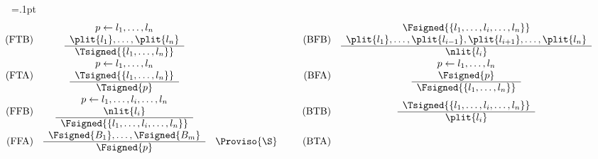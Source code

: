 \arrayrulewidth=.1pt
{\scriptsize %
\[\hspace{-0.75cm}
\begin{array}{@{}rclp{5pt}rcl}
  \text{(FTB)}
  &
  \begin{array}{c}
    p \leftarrow l_1, \dots, l_n
    \\
    \plit{l_1},\dots,\plit{l_n}
    \\\hline
    \Tsigned{\{l_1, \dots, l_n\}}
  \end{array}
  &
  &&
  \text{(BFB)}
  &
  \begin{array}{c}
    \Fsigned{\{l_1, \dots, l_i, \dots, l_n\}}
    \\
    \plit{l_1},\dots,\plit{l_{i-1}}
    ,
    \plit{l_{i+1}},\dots,\plit{l_n}
    \\\hline
    \nlit{l_i}
  \end{array}
  &
  \\[12pt]
  \text{(FTA)}
  &
  \begin{array}{c}
    p \leftarrow l_1, \dots, l_n
    \\
    \Tsigned{\{l_1, \dots, l_n\}}
    \\\hline
    \Tsigned{p}
  \end{array}
  &
  &&
  \text{(BFA)}
  &
  \begin{array}{c}
    p \leftarrow l_1, \dots, l_n
    \\
    \Fsigned{p}
    \\\hline
    \Fsigned{\{l_1, \dots, l_n\}}
  \end{array}
  &
  \\[12pt]
  \text{(FFB)}
  &
  \begin{array}{c}
    p \leftarrow l_1, \dots, l_i, \dots, l_n
    \\
    \nlit{l_i}
    \\\hline
    \Fsigned{\{l_1, \dots, l_i, \dots, l_n\}}
  \end{array}
  &
  &&
  \text{(BTB)}
  &
  \begin{array}{c}
    \Tsigned{\{l_1, \dots, l_i, \dots, l_n\}}
    \\\hline
    \plit{l_i}
  \end{array}
  &
  \\[12pt]
  \text{(FFA)}
  &
  \begin{array}{c}
    \Fsigned{B_1},\dots,\Fsigned{B_m}
    \\\hline
    \Fsigned{p}
  \end{array}
  & \Proviso{\S}
  &&
  \text{(BTA)}
  &
  \begin{array}{c}

\end{array}
\end{array}\]}
